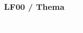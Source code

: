 
{
\begin{frame}  
  \frametitle{LF00 / Thema}

  \vspace{4cm}
  \begin{flushright}
    \textcolor{white}{Allgemeines zum \textit{Thema}}
  \end{flushright}
\end{frame}
}

